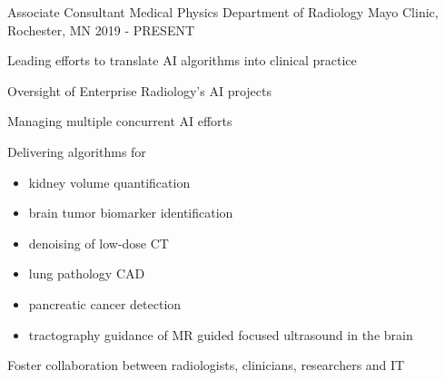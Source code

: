 

\begin{cventries}
  \cventry
      {Associate Consultant Medical Physics} %
      {Department of Radiology} %
      {Mayo Clinic, Rochester, MN} %
      {2019 - PRESENT} %
      {
        \begin{cvitems}
        \item Leading efforts to translate AI algorithms into clinical practice
        \item Oversight of Enterprise Radiology's AI projects
        \item Managing multiple concurrent AI efforts
        \item Delivering algorithms for
        \begin{itemize}
          \item kidney volume quantification
          \item brain tumor biomarker identification
          \item denoising of low-dose CT
          \item lung pathology CAD
          \item pancreatic cancer detection
          \item tractography guidance of MR guided focused ultrasound in the brain
        \end{itemize}
        \item Foster collaboration between radiologists, clinicians, researchers and IT
        \end{cvitems}
      }
      

\end{cventries}

